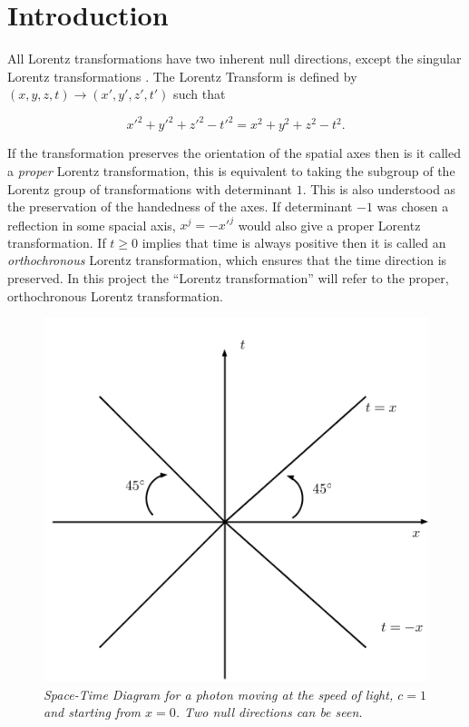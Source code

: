 \section{Introduction}

All Lorentz transformations have two inherent null directions, except the singular Lorentz transformations \cite[p. 85]{Relativity_Synge}. The Lorentz Transform is defined by $(x,y,z,t) \rightarrow (x',y',z',t')$ such that

\begin{equation*}
{x'}^2 + {y'}^2 + {z'}^2 - {t'}^2 = x^2 + y^2 + z^2 - t^2.
\end{equation*}

\noindent If the transformation preserves the orientation of the spatial axes then is it called a \textit{proper} Lorentz transformation, this is equivalent to taking the subgroup of the Lorentz group of transformations with determinant $1$. This is also understood as the preservation of the handedness of the axes. If determinant $-1$ was chosen a reflection in some spacial axis, $x^j = -{x'}^j$ would also give a proper Lorentz transformation. If $t \geq 0$ implies that time is always positive then it is called an \textit{orthochronous} Lorentz transformation, which ensures that the time direction is preserved. In this project the ``Lorentz transformation'' will refer to the proper, orthochronous Lorentz transformation.

\begin{figure}[h!]
\begin{center}
\caption{\textit{Space-Time Diagram for a photon moving at the speed of light, $c=1$ and starting from $x = 0$. Two null directions can be seen.}}
\label{figure_Photon_Space_Time}
\includegraphics[scale=0.8]{figs/1_1.jpg}
\end{center}
\end{figure}


